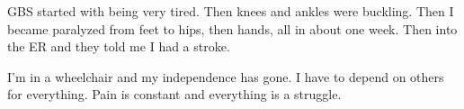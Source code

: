 GBS started with being very tired. Then knees and ankles were buckling. Then I
became paralyzed from feet to hips, then hands, all in about one week. Then into
the ER and they told me I had a stroke.

I’m in a wheelchair and my independence has gone. I have to depend on others for
everything. Pain is constant and everything is a struggle.

